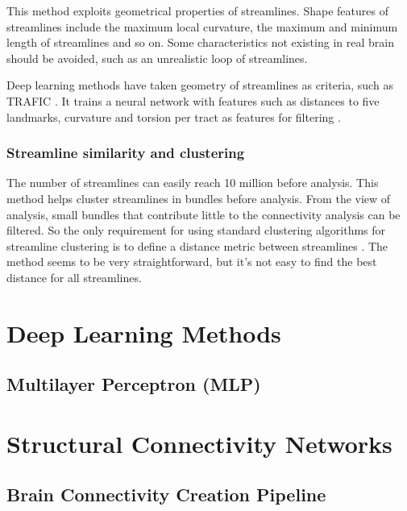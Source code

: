 This method exploits geometrical properties of streamlines.
Shape features of streamlines include the maximum local curvature, the maximum and minimum length of streamlines and so on. 
Some characteristics not existing in real brain should be avoided, such as an unrealistic loop of streamlines. 

Deep learning methods have taken geometry of streamlines as criteria, such as TRAFIC \cite*{lamTRAFICFiberTract2018}. 
It trains a neural network with features such as distances to five landmarks, curvature and torsion per tract as features for filtering \cite*{lamTRAFICFiberTract2018}.

\subsubsection{Streamline similarity and clustering}

The number of streamlines can easily reach 10 million before analysis. 
This method helps cluster streamlines in bundles before analysis. 
From the view of analysis, small bundles that contribute little to the connectivity analysis can be filtered. 
So the only requirement for using standard clustering algorithms for streamline clustering 
is to define a distance metric between streamlines \cite*[]{ozarslanAnisotropyFieldsScales2021}.
The method seems to be very straightforward, but it's not easy to find the best distance for all streamlines.


\section{Deep Learning Methods}
\subsection{Multilayer Perceptron (MLP)}

\section{Structural Connectivity Networks}


\subsection{Brain Connectivity Creation Pipeline}

